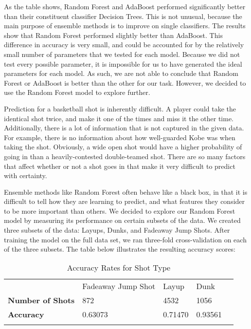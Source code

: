 \documentclass[11pt]{article}
\begin{document}
As the table shows, Random Forest and AdaBoost performed significantly better than their constituent classifier Decision Trees. This is not unusual, because the main purpose of ensemble methods is to improve on single classifiers. The results show that Random Forest performed slightly better than AdaBoost. This difference in accuracy is very small, and could be accounted for by the relatively small number of parameters that we tested for each model. Because we did not test every possible parameter, it is impossible for us to have generated the ideal parameters for each model. As such, we are not able to conclude that Random Forest or AdaBoost is better than the other for our task. However, we decided to use the Random Forest model to explore further. 

Prediction for a basketball shot is inherently difficult. A player could take the identical shot twice, and make it one of the times and miss it the other time. Additionally, there is a lot of information that is not captured in the given data. For example, there is no information about how well-guarded Kobe was when taking the shot. Obviously, a wide open shot would have a higher probability of going in than a heavily-contested double-teamed shot. There are so many factors that affect whether or not a shot goes in that make it very difficult to predict with certainty. 

Ensemble methods like Random Forest often behave like a black box, in that it is difficult to tell how they are learning to predict, and what features they consider to be more important than others. We decided to explore our Random Forest model by measuring its performance on certain subsets of the data. We created three subsets of the data: Layups, Dunks, and Fadeaway Jump Shots. After training the model on the full data set, we ran three-fold cross-validation on each of the three subsets. The table below illustrates the resulting accuracy scores:



\begin{table}[H]
\centering
\caption{Accuracy Rates for Shot Type}
\label{my-label}

\begin{tabular}{lllll}
                         & Fadeaway Jump Shot & Layup   & Dunk    &  \\
\textbf{Number of Shots} & 872                & 4532    & 1056    &  \\
\textbf{Accuracy}        & 0.63073            & 0.71470 & 0.93561 &  \\
                         &                    &         &         & 
\end{tabular}
\end{table}
\end{document}
